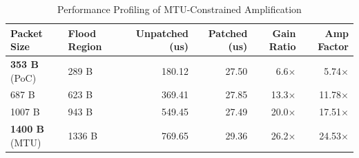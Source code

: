 \begin{table}[htbp]
\centering
\caption{Performance Profiling of MTU-Constrained Amplification}
\label{tab:amp_profiling}
\begin{tabular}{@{}l l r r r r@{}}
\toprule
\textbf{Packet Size} & \textbf{Flood Region} & \textbf{Unpatched (us)} & \textbf{Patched (us)} & \textbf{Gain Ratio} & \textbf{Amp Factor} \\ \midrule
\textbf{353 B} (PoC) & 289 B & 180.12 & 27.50 & 6.6$\times$ & 5.74$\times$ \\
687 B & 623 B & 369.41 & 27.85 & 13.3$\times$ & 11.78$\times$ \\
1007 B & 943 B & 549.45 & 27.49 & 20.0$\times$ & 17.51$\times$ \\
\textbf{1400 B} (MTU) & 1336 B & 769.65 & 29.36 & 26.2$\times$ & 24.53$\times$ \\
\bottomrule
\end{tabular}
\end{table}
